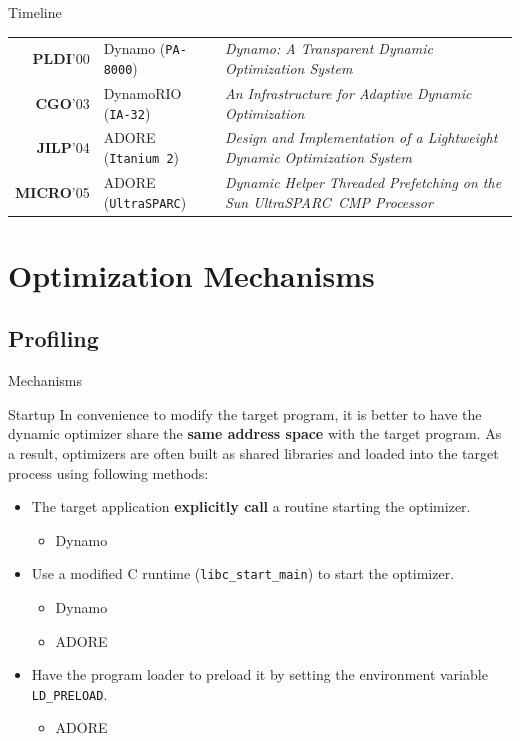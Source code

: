 \documentclass[aspectratio=169,xcolor=x11names]{beamer}
\begin{document}
	\begin{frame}{Timeline}
		\def\arraystretch{2}
		
		\begin{tabular}{@{\,}r <{\hskip 2pt} !{\color{LightSteelBlue3}\makebox[0pt]{\textbullet}\hskip-0.5pt\vrule width 1pt\hspace{\labelsep}} >{\raggedright\arraybackslash}p{2.7cm} p{8cm}}
			\textbf{PLDI}'00 & Dynamo (\texttt{PA-8000}) & \textit{Dynamo: A Transparent Dynamic Optimization System} \\
			\textbf{CGO}'03 & DynamoRIO (\texttt{IA-32}) & \textit{An Infrastructure for Adaptive Dynamic Optimization} \\
			\textbf{JILP}'04 & ADORE (\texttt{Itanium 2}) & \textit{Design and Implementation of a Lightweight Dynamic Optimization System} \\
			\textbf{MICRO}'05 & ADORE (\texttt{UltraSPARC}) & \textit{Dynamic Helper Threaded Prefetching on the Sun UltraSPARC\textregistered\ CMP Processor} \\
		\end{tabular}
	\end{frame}
	
	\section{Optimization Mechanisms}
	\subsection{Profiling}
	\begin{frame}{Mechanisms}
	\end{frame}

	\begin{frame}{Startup}
		In convenience to modify the target program, it is better to have the dynamic optimizer share the \textbf{same address space} with the target program. As a result, optimizers are often built as \alert{shared libraries} and loaded into the target process using following methods:
		\begin{itemize}
			\item The target application \textbf{explicitly call} a routine starting the optimizer.
			\begin{itemize}
				\item Dynamo
			\end{itemize}
			\item Use a modified C runtime (\texttt{libc\_start\_main}) to start the optimizer.
			\begin{itemize}
				\item Dynamo
				\item ADORE
			\end{itemize}
			\item Have the program loader to preload it by setting the environment variable \texttt{LD\_PRELOAD}.
			\begin{itemize}
				\item ADORE
			\end{itemize}
		\end{itemize}
	\end{frame}
	
\end{document}
